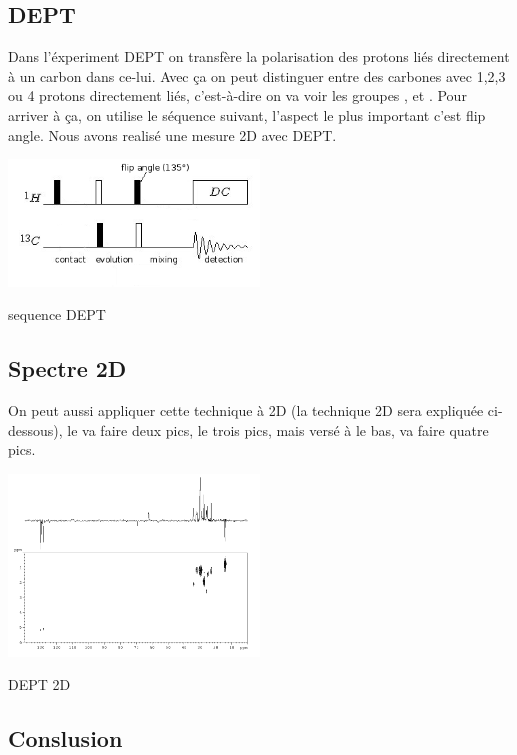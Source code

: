 \documentclass[a4paper,12pt]{scrartcl}
\begin{document}
  \subsection{DEPT }
Dans l'éxperiment DEPT on transfère la polarisation des protons liés directement à un carbon dans ce-lui. Avec \c ca on peut distinguer entre des carbones avec 1,2,3 ou 4 protons directement liés, c'est-à-dire on va voir les groupes ,  et . Pour arriver à \c ca, on utilise le séquence suivant, l'aspect le plus important c'est flip angle.  Nous avons realisé une mesure 2D avec DEPT.
\begin{figurehere}
    \center
    \includegraphics[width=0.5\textwidth]{bilder/DEPT.png}
    \caption{sequence DEPT}
   \end{figurehere}  


  \subsection{Spectre 2D}
   On peut aussi appliquer cette technique à 2D (la technique 2D sera expliquée ci-dessous), le  va faire deux pics, le  trois pics, mais versé à le bas,  va faire quatre pics.
  \begin{figurehere}
    \center
    \includegraphics[width=0.5\textwidth]{bilder/dept_2d.png}
    \caption{DEPT 2D}
   \end{figurehere}

\subsection{Conslusion}
 
\end{document}
